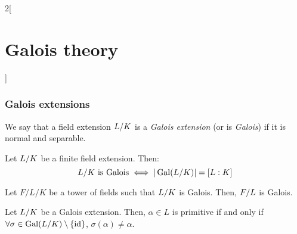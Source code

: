 \documentclass[../../../main.tex]{subfiles}
\begin{document}
\begin{multicols}{2}[\section{Galois theory}]
  \subsubsection{Galois extensions}
  \begin{definition}
    We say that a field extension $\quot{L}{K}$ is a \textit{Galois extension} (or is \textit{Galois}) if it is normal and separable.
  \end{definition}
  \begin{theorem}
    Let $\quot{L}{K}$ be a finite field extension. Then: $$\textstyle\quot{L}{K}\text{ is Galois}\iff|\Gal(\quot{L}{K})|=[L:K]$$
  \end{theorem}
  \begin{lemma}
    Let $F/L/K$ be a tower of fields such that $\quot{L}{K}$ is Galois. Then, $\quot{F}{L}$ is Galois.
  \end{lemma}
  \begin{prop}
    Let $\quot{L}{K}$ be a Galois extension. Then, $\alpha\in L$ is primitive if and only if $\forall \sigma\in\Gal(\quot{L}{K})\setminus\{\id\}$, $\sigma(\alpha)\ne\alpha$.
  \end{prop}

\end{multicols}
\end{document}
